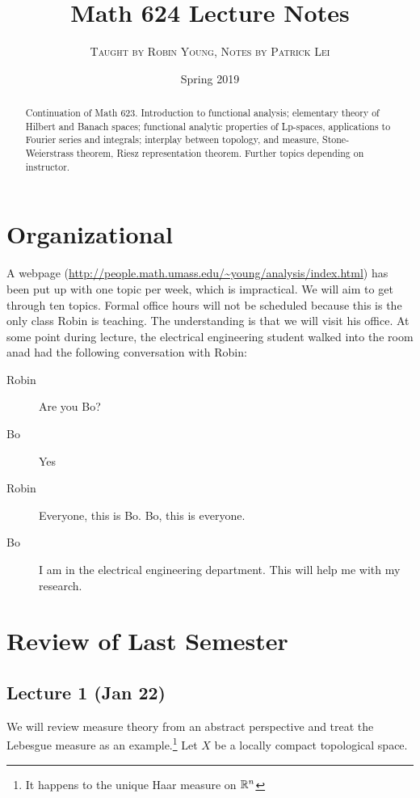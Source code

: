 \documentclass[10pt, twoside]{article}
\title{Math 624 Lecture Notes}
\author{\scshape Taught by Robin Young, Notes by Patrick Lei}
\affil{\itshape University of Massachusetts, Amherst}
\date{Spring 2019}
\begin{document}
    \maketitle\thispagestyle{firstpage}
    
    \begin{abstract}
        Continuation of Math 623. Introduction to functional analysis;
    elementary theory of Hilbert and Banach spaces; functional analytic
properties of Lp-spaces, applications to Fourier series and integrals;
interplay between topology, and measure, Stone-Weierstrass theorem, Riesz
representation theorem. Further topics depending on instructor.  \end{abstract}

    \tableofcontents

    \section{Organizational} A webpage
    (\url{http://people.math.umass.edu/~young/analysis/index.html}) has been
    put up with one topic per week, which is impractical. We will aim to get
    through ten topics. Formal office hours will not be scheduled because this
    is the only class Robin is teaching. The understanding is that we will
    visit his office. At some point during lecture, the electrical engineering
    student walked into the room anad had the following conversation with
    Robin:

    \begin{description} \item[Robin] Are you Bo?  \item[Bo] Yes \item[Robin]
    Everyone, this is Bo. Bo, this is everyone.  \item[Bo] I am in the
    electrical engineering department. This will help me with my research.
    \end{description}

    \section{Review of Last Semester}

    \subsection{Lecture 1 (Jan 22)} We will review measure theory from an
    abstract perspective and treat the Lebesgue measure as an
    example.\footnote{It happens to the unique Haar measure on $\mathbb{R}^n$} Let $X$
    be a locally compact topological space. 
    
\end{document}
